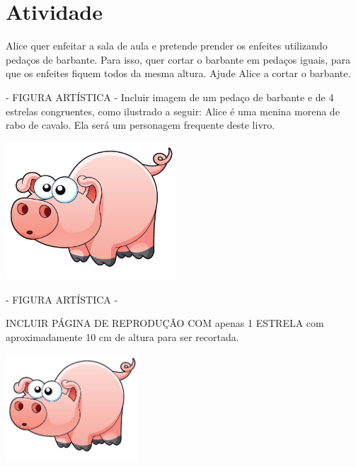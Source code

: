 \documentclass[a4,12pt]{book}
\begin{document}
\section{Atividade}







Alice quer enfeitar a sala de aula e pretende prender os enfeites utilizando pedaços de barbante. Para isso, quer cortar o barbante em pedaços iguais, para que os enfeites fiquem todos da mesma altura. Ajude Alice a cortar o barbante.

\begin{imagem*}[breakable]{}{}    - FIGURA ARTÍSTICA - Incluir imagem de um pedaço de barbante e de 4 estrelas congruentes, como ilustrado a seguir:
  Alice é uma menina morena de rabo de cavalo. Ela será um personagem frequente deste livro.

    \includegraphics[width=180pt, keepaspectratio]{pig}
\end{imagem*}

\begin{imagem*}[breakable]{}{}   - FIGURA ARTÍSTICA -
  \begin{nota*}[breakable]{}{}
    INCLUIR PÁGINA DE REPRODUÇÃO COM apenas 1 ESTRELA com aproximadamente 10 cm de altura para ser recortada.
  \end{nota*}
\end{imagem*}






\includegraphics[width=\textwidth,height=4cm, keepaspectratio]{pig}
\end{document}
